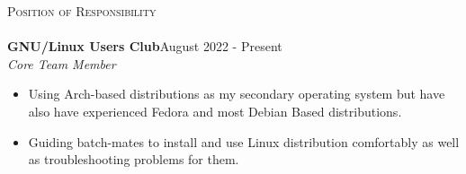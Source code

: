 \documentclass[a4paper]{article}
\newcommand{\lineunder} {
    \vspace*{-8pt} \\
    \hspace*{-18pt} \hrulefill \\
}
\newcommand{\header} [1] {
    {\hspace*{-18pt}\vspace*{6pt} \textsc{#1}}
    \vspace*{-6pt} \lineunder
}
\begin{document}
\vspace{1mm}
\header{Position of Responsibility}
\vspace{0mm}
\textbf{GNU/Linux Users Club}\hfill August 2022 - Present\\
{\textit {Core Team Member}}  
\vspace{-1mm}
\begin{itemize} 
	\item Using Arch-based distributions as my secondary operating system but have also have experienced Fedora and most Debian Based distributions.
     \vspace{-2mm}
        \item Guiding batch-mates to install and use Linux distribution comfortably as well as troubleshooting problems for them. 
\end{itemize}

\vspace{1mm}
\end{document}
